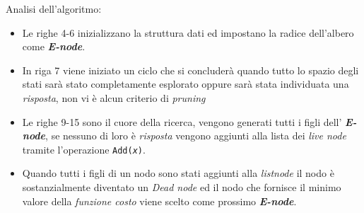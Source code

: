 \documentclass[a4paper]{article}
\newcommand{\imp}[1]{\textbf{\textit{#1}}}
\begin{document}
Analisi dell'algoritmo:
\begin{itemize}
	\item Le righe 4-6 inizializzano la struttura dati ed impostano la radice dell'albero come \imp{E-node}.
	\item In riga 7 viene iniziato un ciclo che si concluderà quando tutto lo spazio degli stati sarà stato completamente esplorato oppure sarà stata individuata una \textit{risposta}, non vi è alcun criterio di \textit{pruning}
	\item Le righe 9-15 sono il cuore della ricerca, vengono generati tutti i figli dell' \imp{E-node}, se nessuno di loro è \textit{risposta} vengono aggiunti alla lista dei \textit{live node} tramite l'operazione \texttt{Add(\textit{x})}. %
	\item Quando tutti i figli di un nodo sono stati aggiunti alla \textit{listnode} il nodo è sostanzialmente diventato un \textit{Dead node} ed il nodo che fornisce il minimo valore della \textit{funzione costo} viene scelto come prossimo \imp{E-node}.
\end{itemize}
\end{document}
